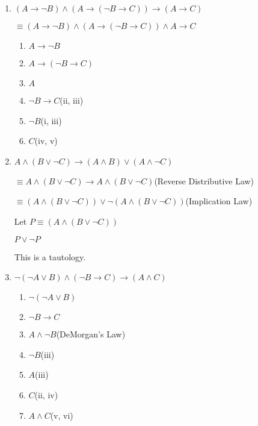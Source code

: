 \documentclass[12pt]{article}
\begin{document}
\begin{enumerate}
\begin{enumerate}
\clearpage
\item
$(A \to \lnot B) \land (A \to (\lnot B \to C)) \to (A \to C)$

$\equiv (A \to \lnot B) \land (A \to (\lnot B \to C)) \land A \to C$

\begin{enumerate}
	\item $A \to \lnot B$
	\item $A \to (\lnot B \to C)$
	\item $A$
	\item $\lnot B \to C$\hfill(ii, iii)
	\item $\lnot B$\hfill(i, iii)
	\item $C$\hfill(iv, v)
\end{enumerate}


\clearpage
\item
$A \land (B \lor \lnot C) \to (A \land B) \lor (A \land \lnot C)$

$\equiv A \land (B \lor \lnot C) \to A \land (B \lor \lnot C)$\hfill(Reverse Distributive Law)

$\equiv (A \land (B \lor \lnot C)) \lor \lnot(A \land (B \lor \lnot C))$\hfill(Implication Law)

Let $P \equiv (A \land (B \lor \lnot C))$

$P \lor \lnot P$

This is a tautology.

\clearpage
\item
$\lnot (\lnot A \lor B) \land (\lnot B \to C) \to (A \land C)$
\begin{enumerate}
	\item $\lnot(\lnot A \lor B)$
	\item $\lnot B \to C$
	\item $A \land \lnot B$\hfill(DeMorgan's Law)
	\item $\lnot B$\hfill(iii)
	\item $A$\hfill(iii)
	\item $C$\hfill(ii, iv)
	\item $A \land C$\hfill(v, vi)
\end{enumerate}

\clearpage

\end{enumerate}

\end{enumerate}
\end{document}
